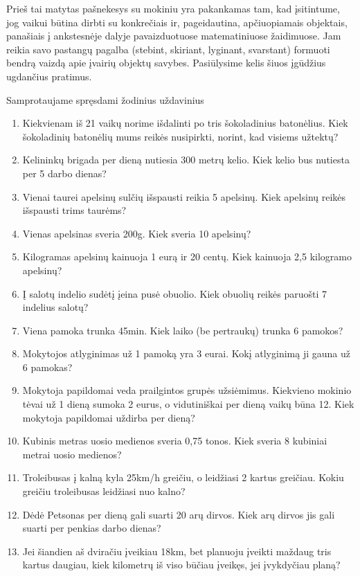 \documentclass{article}
\begin{document}
Prieš tai matytas pašnekesys su mokiniu yra pakankamas tam, kad įsitintume, jog vaikui būtina dirbti su konkrečiais ir, pageidautina, apčiuopiamais objektais, panašiais į ankstesnėje dalyje pavaizduotuose matematiniuose žaidimuose. Jam reikia savo pastangų pagalba (stebint, skiriant, lyginant, svarstant) formuoti bendrą vaizdą apie įvairių objektų savybes. Pasiūlysime kelis šiuos įgūdžius ugdančius pratimus.

\begin{mybox}{Samprotaujame spręsdami žodinius uždavinius}
{\footnotesize
\begin{enumerate}
\item Kiekvienam iš 21 vaikų norime išdalinti po tris šokoladinius batonėlius. Kiek šokoladinių batonėlių mums reikės nusipirkti, norint, kad visiems užtektų? 
\item Kelininkų brigada per dieną nutiesia 300 metrų kelio. Kiek kelio bus nutiesta per 5 darbo dienas?
\item Vienai taurei apelsinų sulčių išspausti reikia 5 apelsinų. Kiek apelsinų reikės išspausti trims taurėms?
\item Vienas apelsinas sveria 200g. Kiek sveria 10 apelsinų?
\item Kilogramas apelsinų kainuoja 1 eurą ir 20 centų. Kiek kainuoja 2,5 kilogramo apelsinų?
\item Į salotų indelio sudėtį įeina pusė obuolio. Kiek obuolių reikės paruošti 7 indelius salotų?
\item Viena pamoka trunka 45min. Kiek laiko (be pertraukų) trunka 6 pamokos?
\item Mokytojos atlyginimas už 1 pamoką yra 3 eurai. Kokį atlyginimą ji gauna už 6 pamokas?
\item Mokytoja papildomai veda prailgintos grupės užsiėmimus. Kiekvieno mokinio tėvai už 1 dieną sumoka 2 eurus, o vidutiniškai per dieną vaikų būna 12. Kiek mokytoja papildomai uždirba per dieną?
\item Kubinis metras uosio medienos sveria 0,75 tonos. Kiek sveria 8 kubiniai metrai uosio medienos?
\item Troleibusas į kalną kyla 25km/h greičiu, o leidžiasi 2 kartus greičiau. Kokiu greičiu troleibusas leidžiasi nuo kalno?
\item Dėdė Petsonas per dieną gali suarti 20 arų dirvos. Kiek arų dirvos jis gali suarti per penkias darbo dienas?
\item Jei šiandien aš dviračiu įveikiau 18km, bet planuoju įveikti maždaug tris kartus daugiau, kiek kilometrų iš viso būčiau įveikęs, jei įvykdyčiau planą? 

\end{enumerate}}
\end{mybox}
\end{document}
